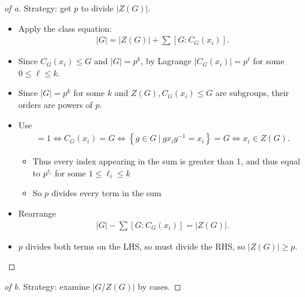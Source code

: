 \begin{solution}

\envlist

\begin{proof}[of a]

Strategy: get \(p\) to divide \({\left\lvert {Z(G)} \right\rvert}\).

\begin{itemize}
\item
  Apply the class equation:
  \begin{align*}
  {\left\lvert {G} \right\rvert} = {\left\lvert {Z(G)} \right\rvert} + \sum [G: C_G(x_i)]
  .\end{align*}
\item
  Since \(C_G(x_i) \leq G\) and
  \({\left\lvert {G} \right\rvert} = p^k\), by Lagrange
  \({\left\lvert {C_G(x_i)} \right\rvert} = p^\ell\) for some
  \(0\leq \ell \leq k\).
\item
  Since \({\left\lvert {G} \right\rvert} = p^k\) for some \(k\) and
  \(Z(G), C_G(x_i) \leq G\) are subgroups, their orders are powers of
  \(p\).
\item
  Use
  \begin{align*}[G: C_G(x_i)] = 1 \iff C_G(x_i) = G \iff \left\{{g\in G{~\mathrel{\Big|}~}gx_ig^{-1}= x_i}\right\} = G \iff x_i \in Z(G).\end{align*}

  \begin{itemize}
  \tightlist
  \item
    Thus every index appearing in the sum is greater than 1, and thus
    equal to \(p^{\ell_i}\) for some \(1\leq \ell_i \leq k\)
  \item
    So \(p\) divides every term in the sum
  \end{itemize}
\item
  Rearrange
  \begin{align*}
  {\left\lvert {G} \right\rvert} -  \sum [G: C_G(x_i)]
  = {\left\lvert {Z(G)} \right\rvert} 
  .\end{align*}
\item
  \(p\) divides both terms on the LHS, so must divide the RHS, so
  \({\left\lvert {Z(G)} \right\rvert} \geq p\).
\end{itemize}

\end{proof}

\begin{proof}[of b]

Strategy: examine \({\left\lvert {G/Z(G)} \right\rvert}\) by cases.


\end{proof}
\end{solution}
